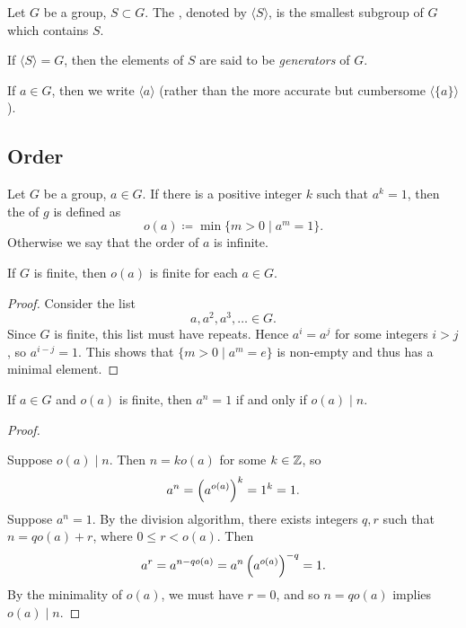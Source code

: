 \begin{definition}
Let $G$ be a group, $S\subset G$. The , denoted by $\langle S\rangle$, is the smallest subgroup of $G$ which contains $S$.

If $\langle S\rangle=G$, then the elements of $S$ are said to be \emph{generators} of $G$.
\end{definition}

\begin{notation}
If $a\in G$, then we write $\langle a\rangle$ (rather than the more accurate but cumbersome $\langle\{a\}\rangle$).
\end{notation}

\subsection{Order}
\begin{definition}[Order]
Let $G$ be a group, $a\in G$. If there is a positive integer $k$ such that $a^k=1$, then the  of $g$ is defined as
\[o(a)\coloneqq\min\{m>0\mid a^m=1\}.\]
Otherwise we say that the order of $a$ is infinite.
\end{definition}

\begin{proposition}
If $G$ is finite, then $o(a)$ is finite for each $a\in G$.
\end{proposition}

\begin{proof}
Consider the list
\[a,a^2,a^3,\dots\in G.\]
Since $G$ is finite, this list must have repeats. Hence $a^i=a^j$ for some integers $i>j$, so $a^{i-j}=1$. This shows that $\{m>0\mid a^m=e\}$ is non-empty and thus has a minimal element.
\end{proof}

\begin{proposition}
If $a\in G$ and $o(a)$ is finite, then $a^n=1$ if and only if $o(a)\mid n$.
\end{proposition}

\begin{proof} \

\fbox{$\impliedby$} Suppose $o(a)\mid n$. Then $n=ko(a)$ for some $k\in\mathbb Z$, so
\[a^n=\left(a^{o(a)}\right)^k=1^k=1.\]
\fbox{$\implies$} Suppose $a^n=1$. By the division algorithm, there exists integers $q,r$ such that $n=qo(a)+r$, where $0\le r<o(a)$. Then
\[a^r=a^{n-qo(a)}=a^n\left(a^{o(a)}\right)^{-q}=1.\]
By the minimality of $o(a)$, we must have $r=0$, and so $n=qo(a)$ implies $o(a)\mid n$.
\end{proof}


